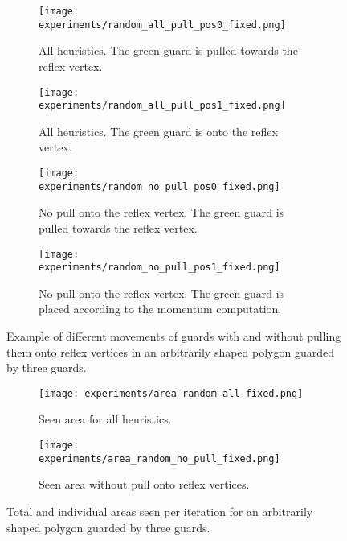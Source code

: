 \newpage
\begin{figure}[h!]
    \centering
    \begin{subfigure}{0.45\textwidth}
        \texttt{[image: experiments/random\_all\_pull\_pos0\_fixed.png]}
        \caption{All heuristics. The green guard is pulled towards the reflex vertex.}
        \label{fig:all_pull_pos0}
    \end{subfigure}
    \hfill
    \begin{subfigure}{0.45\textwidth}
        \texttt{[image: experiments/random\_all\_pull\_pos1\_fixed.png]}
        \caption{All heuristics. The green guard is onto the reflex vertex.}
        \label{fig:all_pull_pos1}
    \end{subfigure}
    \begin{subfigure}{0.45\textwidth}
        \texttt{[image: experiments/random\_no\_pull\_pos0\_fixed.png]}
        \caption{No pull onto the reflex vertex. The green guard is pulled towards the reflex vertex.}
        \label{fig:no_pull_pos0}
    \end{subfigure}
    \hfill
    \begin{subfigure}{0.45\textwidth}
        \texttt{[image: experiments/random\_no\_pull\_pos1\_fixed.png]}
        \caption{No pull onto the reflex vertex. The green guard is placed according to the momentum computation.}
        \label{fig:no_pull_pos1}
    \end{subfigure}
    \caption{Example of different movements of guards with and without pulling them onto reflex vertices in an arbitrarily shaped polygon guarded by three guards.}
    \label{fig:no_pull_eg}
\end{figure}
\vfill
\begin{figure}[!h]
    \begin{subfigure}{0.45\textwidth}
        \texttt{[image: experiments/area\_random\_all\_fixed.png]}
        \caption{Seen area for all heuristics.}
        \label{fig:area_all_pull}
    \end{subfigure}
    \hfill
    \begin{subfigure}{0.45\textwidth}
        \texttt{[image: experiments/area\_random\_no\_pull\_fixed.png]}
        \caption{Seen area without pull onto reflex vertices.}
        \label{fig:area_no_pull}
    \end{subfigure}
    \caption{Total and individual areas seen per iteration for an arbitrarily shaped polygon guarded by three guards.}
    \label{fig:no_pull_plots}
\end{figure}

